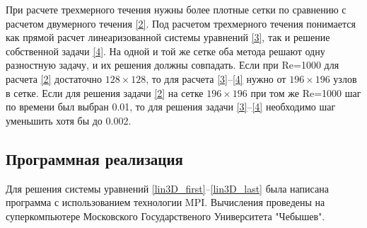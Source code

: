 При расчете трехмерного течения нужны более плотные сетки по сравнению с расчетом двумерного течения \ref{2}. Под расчетом трехмерного течения понимается как прямой расчет линеаризованной системы уравнений \ref{3}, так и решение собственной задачи \ref{4}. На одной и той же сетке оба метода решают одну разностную задачу, и их решения должны совпадать. Если при Re=1000 для расчета \ref{2} достаточно $128 \times 128$, то для расчета \ref{3}--\ref{4} нужно от $196 \times 196$ узлов в сетке. Если для решения задачи \ref{2} на сетке $196 \times 196$ при том же Re=1000 шаг по времени был выбран 0.01, то для решения задачи \ref{3}--\ref{4} необходимо шаг уменьшить хотя бы до 0.002.  

\subsection{Программная реализация}

Для решения системы уравнений \ref{lin3D_first}--\ref{lin3D_last} была написана программа с использованием технологии MPI. Вычисления проведены на суперкомпьютере Московского Государственого Университета "Чебышев". 
